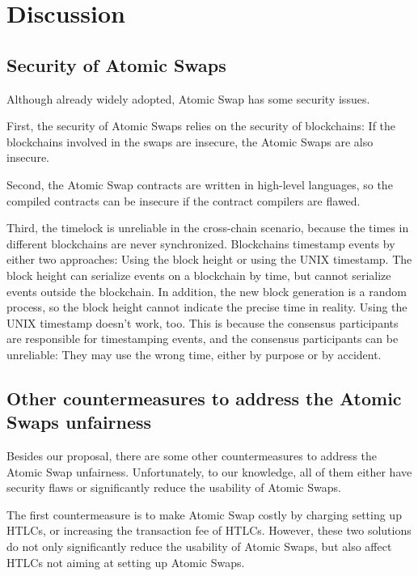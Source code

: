 \section{Discussion}
\label{sec:discussion}

\subsection{Security of Atomic Swaps}

Although already widely adopted, Atomic Swap has some security issues.

First, the security of Atomic Swaps relies on the security of blockchains:
If the blockchains involved in the swaps are insecure, the Atomic Swaps are also insecure.

Second, the Atomic Swap contracts are written in high-level languages, so the compiled contracts can be insecure if the contract compilers are flawed.

Third, the timelock is unreliable in the cross-chain scenario, because the times in different blockchains are never synchronized.
Blockchains timestamp events by either two approaches: Using the block height or using the UNIX timestamp.
The block height can serialize events on a blockchain by time, but cannot serialize events outside the blockchain.
In addition, the new block generation is a random process, so the block height cannot indicate the precise time in reality.
Using the UNIX timestamp doesn't work, too.
This is because the consensus participants are responsible for timestamping events, and the consensus participants can be unreliable: They may use the wrong time, either by purpose or by accident.


\subsection{Other countermeasures to address the Atomic Swaps unfairness}

Besides our proposal, there are some other countermeasures to address the Atomic Swap unfairness.
Unfortunately, to our knowledge, all of them either have security flaws or significantly reduce the usability of Atomic Swaps.

The first countermeasure is to make Atomic Swap costly by charging setting up HTLCs, or increasing the transaction fee of HTLCs.
However, these two solutions do not only significantly reduce the usability of Atomic Swaps, but also affect HTLCs not aiming at setting up Atomic Swaps.

